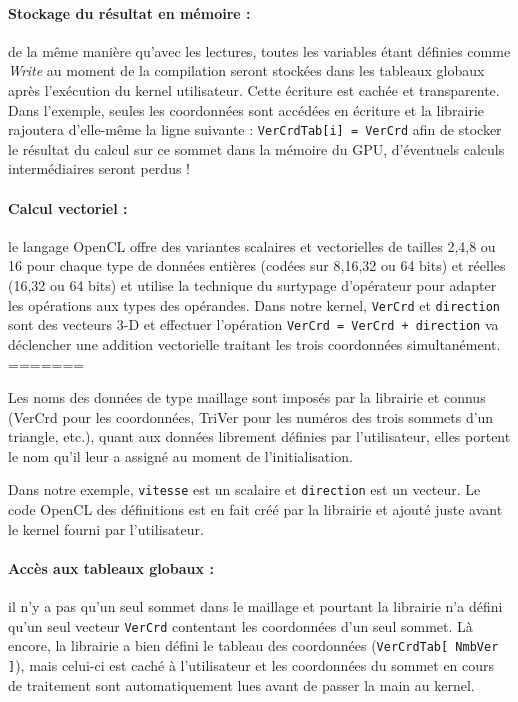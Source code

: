\documentclass[a4paper,12pt]{article}
\begin{document}
\paragraph{Stockage du résultat en mémoire : } de la même manière qu'avec les lectures, toutes les variables étant définies comme \emph{Write} au moment de la compilation seront stockées dans les tableaux globaux après l'exécution du kernel utilisateur.
Cette écriture est cachée et transparente. Dans l'exemple, seules les coordonnées sont accédées en écriture et la librairie rajoutera d'elle-même la ligne suivante : {\tt VerCrdTab[i] = VerCrd} afin de stocker le résultat du calcul sur ce sommet dans la mémoire du GPU, d'éventuels calculs intermédiaires seront perdus !

\paragraph{Calcul vectoriel : } le langage OpenCL offre des variantes scalaires et vectorielles de tailles 2,4,8 ou 16 pour chaque type de données entières (codées sur 8,16,32 ou 64 bits) et réelles (16,32 ou 64 bits) et utilise la technique du surtypage d'opérateur pour adapter les opérations aux types des opérandes.
Dans notre kernel, {\tt VerCrd} et {\tt direction} sont des vecteurs 3-D et effectuer l'opération {\tt VerCrd = VerCrd + direction} va déclencher une addition vectorielle traitant les trois coordonnées simultanément.
=======

Les noms des données de type maillage sont imposés par la librairie et connus (VerCrd pour les coordonnées, TriVer pour les numéros des trois sommets d'un triangle, etc.), quant aux données librement définies par l'utilisateur, elles portent le nom qu'il leur a assigné au moment de l'initialisation.

Dans notre exemple, {\tt vitesse} est un scalaire et {\tt direction} est un vecteur. Le code OpenCL des définitions est en fait créé par la librairie et ajouté juste avant le kernel fourni par l'utilisateur.

\paragraph{Accès aux tableaux globaux : } il n'y a pas qu'un seul sommet dans le maillage et pourtant la librairie n'a défini qu'un seul vecteur {\tt VerCrd} contentant les coordonnées d'un seul sommet.
Là encore, la librairie a bien défini le tableau des coordonnées ({\tt VerCrdTab[ NmbVer ]}), mais celui-ci est caché à l'utilisateur et les coordonnées du sommet en cours de traitement sont automatiquement lues avant de passer la main au kernel.
\end{document}
